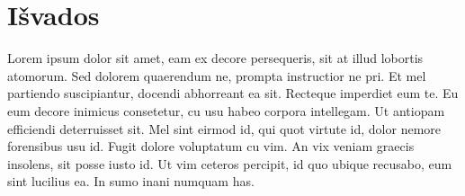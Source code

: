 \section*{Išvados}
Lorem ipsum dolor sit amet, eam ex decore persequeris, sit at illud lobortis
atomorum. Sed dolorem quaerendum ne, prompta instructior ne pri. Et mel
partiendo suscipiantur, docendi abhorreant ea sit. Recteque imperdiet eum te.
Eu eum decore inimicus consetetur, cu usu habeo corpora intellegam. Ut antiopam
efficiendi deterruisset sit. Mel sint eirmod id, qui quot virtute id, dolor
nemore forensibus usu id. Fugit dolore voluptatum cu vim. An vix veniam graecis
insolens, sit posse iusto id. Ut vim ceteros percipit, id quo ubique recusabo,
eum sint lucilius ea. In sumo inani numquam has.

